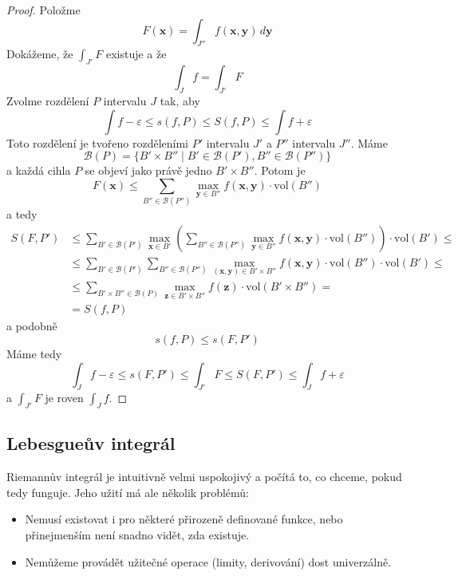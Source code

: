 \documentclass[../main.tex]{subfiles}
\begin{document}
\begin{proof}
	Položme
	\[ F(\mathbf{x}) = \int_{J''} f(\mathbf{x}, \mathbf{y}) \,d\mathbf{y} \]
	Dokážeme, že $\int_{J'} F$ existuje a že
	\[ \int_{J} f = \int_{J'} F \]
	Zvolme rozdělení $P$ intervalu $J$ tak, aby
	\[ \int f - \varepsilon \leq s(f,P) \leq S(f,P) \leq \int f + \varepsilon \]
	Toto rozdělení je tvořeno rozděleními $P'$ intervalu $J'$ a $P''$ intervalu $J''$. Máme
	\[ \mathcal{B}(P) = \{ B' \times B'' \mid B' \in \mathcal{B}(P'), B'' \in \mathcal{B}(P'') \} \]
	a každá cihla $P$ se objeví jako právě jedno $B' \times B''$. Potom je
	\[ F(\mathbf{x}) \leq \sum_{B''\in \mathcal{B}(P'')}
	\max_{\mathbf{y} \in B''} f(\mathbf{x}, \mathbf{y}) \cdot \textrm{vol}(B'') \]
	a tedy
	\begin{align*}
	    S(F, P')
	    &\leq \sum_{B' \in \mathcal{B}(P')} \max_{\mathbf{x}\in B'}
	    \left( \sum_{B'' \in \mathcal{B}(P'')} \max_{\mathbf{y}\in B''}
	    f(\mathbf{x}, \mathbf{y}) \cdot \textrm{vol}(B'')\right) \cdot \textrm{vol}(B') \leq\\
	    &\leq \sum_{B' \in \mathcal{B}(P')} \sum_{B'' \in \mathcal{B}(P'')}
	    \max_{(\mathbf{x}, \mathbf{y}) \in B' \times B''} f(\mathbf{x}, \mathbf{y})
	    \cdot \textrm{vol}(B'') \cdot \textrm{vol}(B') \leq\\
	    &\leq \sum_{B' \times B'' \in \mathcal{B}(P)} \max_{\mathbf{z}\in B' \times B''}
	    f(\mathbf{z}) \cdot \textrm{vol}(B' \times B'') =\\
			&= S(f,P)
	\end{align*}
	a podobně
	\[ s(f,P) \leq s(F,P') \]
	Máme tedy
	\[ \int_{J} f - \varepsilon \leq s(F,P') \leq \int_{J'} F \leq S(F,P') \leq \int_{J} f + \varepsilon \]
	a $\int_{J'} F$ je roven $\int_{J} f$.
\end{proof}

\subsection{Lebesgueův integrál}
Riemannův integrál je intuitivně velmi uspokojivý a počítá to, co chceme, pokud tedy funguje.
Jeho užití má ale několik problémů:
\begin{itemize}
    \item Nemusí existovat i pro některé přirozeně definované funkce, nebo
    přinejmenším není snadno vidět, zda existuje.
    \item Nemůžeme provádět užitečné operace (limity, derivování) dost univerzálně.
\end{itemize}
\end{document}
